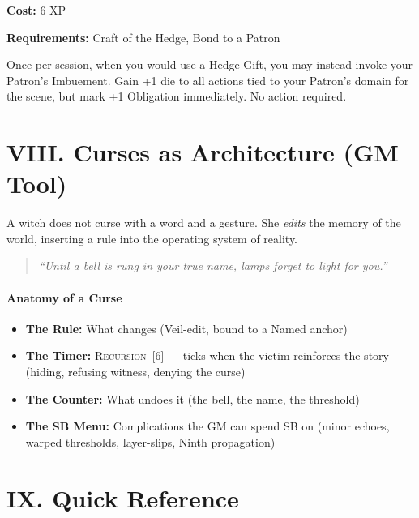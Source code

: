 \documentclass[11pt,letterpaper]{article}
\newcommand{\timer}[2]{\textsc{#1}~[#2]}
\begin{document}
\begin{tcolorbox}[colback=black!3,colframe=black!60,title=Talent: Hedge Gift of the Patron (Optional),breakable]
\textbf{Cost:} 6 XP

\textbf{Requirements:} Craft of the Hedge, Bond to a Patron

Once per session, when you would use a Hedge Gift, you may instead invoke your Patron's Imbuement. Gain +1 die to all actions tied to your Patron's domain for the scene, but mark +1 Obligation immediately. No action required.
\end{tcolorbox}

\section{VIII. Curses as Architecture (GM Tool)}

A witch does not curse with a word and a gesture. She \textit{edits} the memory of the world, inserting a rule into the operating system of reality.

\begin{quote}
\itshape ``Until a bell is rung in your true name, lamps forget to light for you.''
\end{quote}

\paragraph{Anatomy of a Curse}
\begin{itemize}
    \item \textbf{The Rule:} What changes (Veil-edit, bound to a Named anchor)
    \item \textbf{The Timer:} \timer{Recursion}{6} --- ticks when the victim reinforces the story (hiding, refusing witness, denying the curse)
    \item \textbf{The Counter:} What undoes it (the bell, the name, the threshold)
    \item \textbf{The SB Menu:} Complications the GM can spend SB on (minor echoes, warped thresholds, layer-slips, Ninth propagation)
\end{itemize}

\section{IX. Quick Reference}
\end{document}
